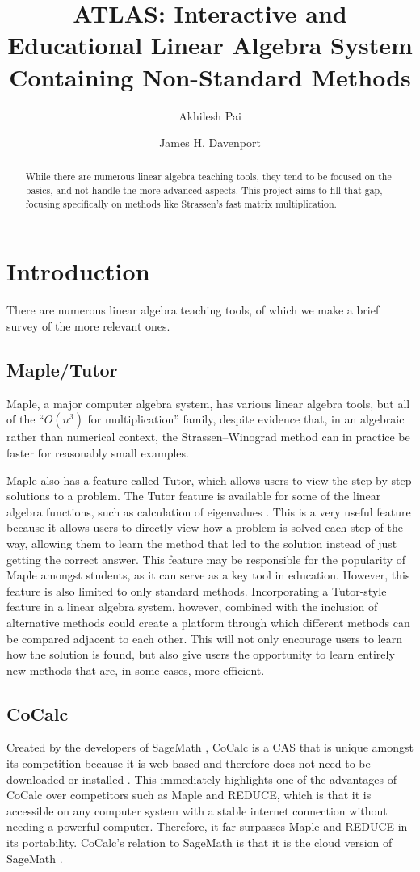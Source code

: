 \documentclass[natbib]{llncs}
\title{ATLAS: Interactive and Educational Linear Algebra System Containing Non-Standard Methods}
\author{Akhilesh Pai\inst{1} \and James H. Davenport\inst{1}}
\institute{
${}^1$  University of Bath, Bath BA2 7AY, UK\\
  \email{abp43@bath.ac.uk}; \email{J.H.Davenport@bath.ac.uk} 
}
\begin{document}
\maketitle

\begin{abstract}
While there are numerous linear algebra teaching tools, they tend to be focused on the basics, and not handle the more advanced aspects. This project aims to fill that gap, focusing specifically on methods like Strassen's fast matrix multiplication.
\end{abstract}
\section{Introduction}
There are numerous linear algebra teaching tools, of which we make a brief survey of the more relevant ones.
\subsection{Maple/Tutor}
Maple, a major computer algebra system, has various linear algebra tools, but all of the ``$O(n^3)$ for multiplication'' family, despite evidence \cite{Tonksetal2017a} that, in an algebraic rather than numerical context, the Strassen--Winograd \cite{Strassen1969,Winograd1971} method can in practice be faster for reasonably small examples.

Maple also has a feature called Tutor, which allows users to view the step-by-step solutions to a problem. The Tutor feature is available for some of the linear algebra functions, such as calculation of eigenvalues \cite{eigentutor}.  This is a very useful feature because it allows users to directly view how a problem
is solved each step of the way, allowing them to learn the method that led to the solution instead of just
getting the correct answer. This feature may be responsible for the popularity of Maple amongst students,
as it can serve as a key tool in education. However, this feature is also limited to only standard methods.
Incorporating a Tutor-style feature in a linear algebra system, however, combined with the inclusion of
alternative methods could create a platform through which different methods can be compared adjacent
to each other. This will not only encourage users to learn how the solution is found, but also give users
the opportunity to learn entirely new methods that are, in some cases, more efficient.
\subsection{CoCalc}
Created by the developers of SageMath \cite{sagemath}, CoCalc \cite{Stein2018a} is a CAS that is unique amongst its competition because it is web-based and therefore does not need to be downloaded or installed \cite{cocalc}. This immediately highlights one of the advantages of CoCalc over competitors such as Maple and REDUCE, which is that it is accessible on any computer system with a stable internet connection without needing a powerful computer. Therefore, it far surpasses Maple and REDUCE in its portability. CoCalc's relation to SageMath is that it is the cloud version of SageMath \cite{sagebook}.
\end{document}
